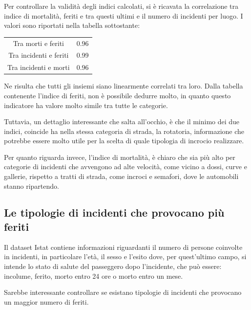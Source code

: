 \documentclass[a4paper,12pt]{report}
\begin{document}
Per controllare la validità degli indici calcolati, si è ricavata la correlazione 
tra indice di mortalità, feriti e tra questi ultimi e il numero di incidenti per 
luogo. 
I valori sono riportati nella tabella sottostante: 

\begin{center}
    \def\arraystretch{1.5}%
    \begin{tabular}{ |c|c| }
        \hline
        \rowcolor{TableGray}
        Tra morti e feriti      & 0.96 \\ 
        Tra incidenti e feriti  & 0.99 \\
        \rowcolor{TableGray}
        Tra incidenti e morti   & 0.96 \\
        \hline
    \end{tabular}
\end{center}

Ne risulta che tutti gli insiemi siano linearmente correlati tra loro. 
Dalla tabella contenente l'indice di feriti, non è possibile dedurre molto, 
in quanto questo indicatore ha valore molto simile tra tutte le categorie. 

Tuttavia, un dettaglio interessante che salta all'occhio, è che il minimo dei due indici, 
coincide ha nella stessa categoria di strada, 
la rotatoria, informazione che potrebbe essere molto utile per 
la scelta di quale tipologia di incrocio realizzare. 

Per quanto riguarda invece, l'indice di mortalità, è chiaro che sia più alto 
per categorie di incidenti che avvengono ad alte velocità, come vicino a dossi, 
curve e gallerie, rispetto a tratti di strada, come incroci e semafori, 
dove le automobili stanno ripartendo. 

\subsection{Le tipologie di incidenti che provocano più feriti}

Il dataset Istat contiene informazioni riguardanti il numero di persone coinvolte 
in incidenti, in particolare l'età, il sesso e l'esito dove, 
per quest'ultimo campo, si intende lo stato di salute del passeggero 
dopo l'incidente, che può essere: incolume, ferito, morto entro 24 ore o morto entro un mese. 

Sarebbe interessante controllare se esistano tipologie di incidenti che provocano 
un maggior numero di feriti. 
\end{document}
